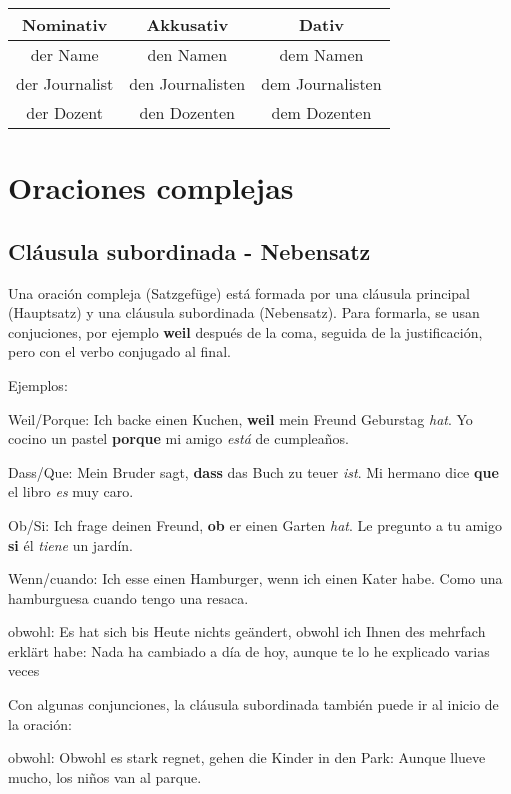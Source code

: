 \begin{tabular}{|c | c | c |}
\hline
\textbf{Nominativ} & \textbf{Akkusativ} & \textbf{Dativ}\\
\hline
der Name & den Namen & dem Namen \\
der Journalist & den Journalisten & dem Journalisten \\
der Dozent & den Dozenten & dem Dozenten \\
\hline
\end{tabular}

\section{Oraciones complejas}
\subsection{Cláusula subordinada - Nebensatz}
Una oración compleja (Satzgefüge) está formada por una cláusula principal (Hauptsatz) y una cláusula subordinada (Nebensatz). Para formarla, se usan conjuciones, por ejemplo \textbf{weil} después de la coma, seguida de la justificación, pero con el verbo conjugado al final.

Ejemplos: 
\begin{myitemize}
\item Weil/Porque: Ich backe einen Kuchen, \textbf{weil} mein Freund Geburstag \textit{hat}. Yo cocino un pastel \textbf{porque} mi amigo \textit{está} de cumpleaños.
\item Dass/Que: Mein Bruder sagt, \textbf{dass} das Buch zu teuer \textit{ist}. Mi hermano dice \textbf{que} el libro \textit{es} muy caro.
\item Ob/Si: Ich frage deinen Freund, \textbf{ob} er einen Garten \textit{hat}. Le pregunto a tu amigo \textbf{si} él \textit{tiene} un jardín.
\item Wenn/cuando: Ich esse einen Hamburger, wenn ich einen Kater habe. Como una hamburguesa cuando tengo una resaca.
\item obwohl: Es hat sich bis Heute nichts geändert, obwohl ich Ihnen des mehrfach erklärt habe: Nada ha cambiado a día de hoy, aunque te lo he explicado varias veces 
\end{myitemize}

Con algunas conjunciones, la cláusula subordinada también puede ir al inicio de la oración:
\begin{myitemize}
\item obwohl: Obwohl es stark regnet, gehen die Kinder in den Park: Aunque llueve mucho, los niños van al parque.
\end{myitemize}

